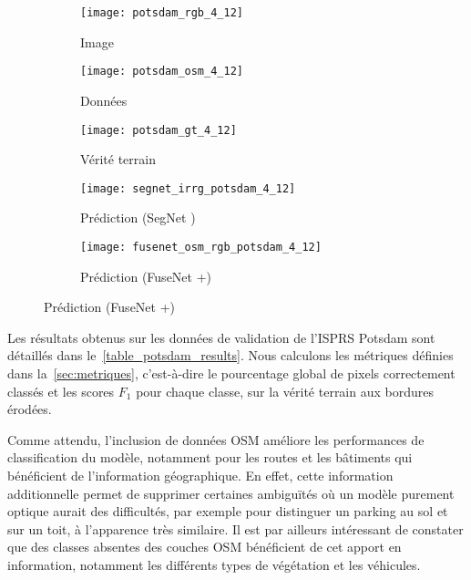 \begin{figure}[h]
\begin{subfigure}{0.33\linewidth}
	\texttt{[image: potsdam\_rgb\_4\_12]}
    \caption{Image }
\end{subfigure}
\hfill
\begin{subfigure}{0.33\linewidth}
    \texttt{[image: potsdam\_osm\_4\_12]}
    \caption{Données }
\end{subfigure}
\hfill
\begin{subfigure}{0.33\linewidth}
	\texttt{[image: potsdam\_gt\_4\_12]}
    \caption{Vérité terrain}
\end{subfigure}
\begin{subfigure}{0.49\linewidth}
	\texttt{[image: segnet\_irrg\_potsdam\_4\_12]}
    \caption{Prédiction (SegNet )}
\end{subfigure}
\hfill
\begin{subfigure}{0.49\linewidth}
	\texttt{[image: fusenet\_osm\_rgb\_potsdam\_4\_12]}
    \caption{Prédiction (FuseNet +)}
\end{subfigure}
\label{fig:potsdam_qualitative}
\end{figure}

Les résultats obtenus sur les données de validation de l'\gls{ISPRS} Potsdam sont détaillés dans le~\cref{table_potsdam_results}. Nous calculons les métriques définies dans la~\cref{sec:metriques}, c'est-à-dire le pourcentage global de pixels correctement classés et les scores $F_1$ pour chaque classe, sur la vérité terrain aux bordures érodées.

Comme attendu, l'inclusion de données \gls{OSM} améliore les performances de classification du modèle, notamment pour les routes et les bâtiments qui bénéficient de l'information géographique. En effet, cette information additionnelle permet de supprimer certaines ambiguïtés où un modèle purement optique aurait des difficultés, par exemple pour distinguer un parking au sol et sur un toit, à l'apparence très similaire. Il est par ailleurs intéressant de constater que des classes absentes des couches \gls{OSM} bénéficient de cet apport en information, notamment les différents types de végétation et les véhicules.

